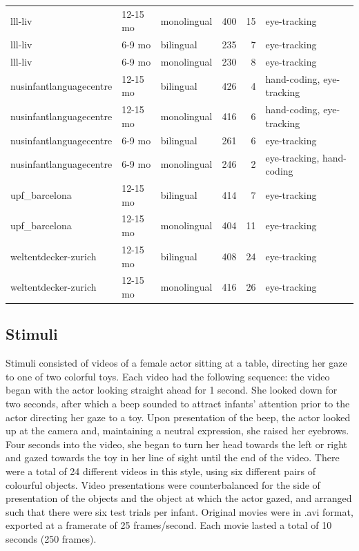 \documentclass[,man,floatsintext]{apa6}
\begin{document}
\begin{longtable}[t]{lllrrl}
lll-liv & 12-15 mo & monolingual & 400 & 15 & eye-tracking\\
lll-liv & 6-9 mo & bilingual & 235 & 7 & eye-tracking\\
lll-liv & 6-9 mo & monolingual & 230 & 8 & eye-tracking\\
nusinfantlanguagecentre & 12-15 mo & bilingual & 426 & 4 & hand-coding, eye-tracking\\
\addlinespace
nusinfantlanguagecentre & 12-15 mo & monolingual & 416 & 6 & hand-coding, eye-tracking\\
nusinfantlanguagecentre & 6-9 mo & bilingual & 261 & 6 & eye-tracking\\
nusinfantlanguagecentre & 6-9 mo & monolingual & 246 & 2 & eye-tracking, hand-coding\\
upf\_barcelona & 12-15 mo & bilingual & 414 & 7 & eye-tracking\\
upf\_barcelona & 12-15 mo & monolingual & 404 & 11 & eye-tracking\\
\addlinespace
weltentdecker-zurich & 12-15 mo & bilingual & 408 & 24 & eye-tracking\\
weltentdecker-zurich & 12-15 mo & monolingual & 416 & 26 & eye-tracking\\
\bottomrule
\end{longtable}

\hypertarget{stimuli}{%
\subsection{Stimuli}\label{stimuli}}

Stimuli consisted of videos of a female actor sitting at a table, directing her gaze to one of two colorful toys. Each video had the following sequence: the video began with the actor looking straight ahead for 1 second. She looked down for two seconds, after which a beep sounded to attract infants' attention prior to the actor directing her gaze to a toy. Upon presentation of the beep, the actor looked up at the camera and, maintaining a neutral expression, she raised her eyebrows. Four seconds into the video, she began to turn her head towards the left or right and gazed towards the toy in her line of sight until the end of the video. There were a total of 24 different videos in this style, using six different pairs of colourful objects. Video presentations were counterbalanced for the side of presentation of the objects and the object at which the actor gazed, and arranged such that there were six test trials per infant. Original movies were in .avi format, exported at a framerate of 25 frames/second. Each movie lasted a total of 10 seconds (250 frames).
\end{document}
